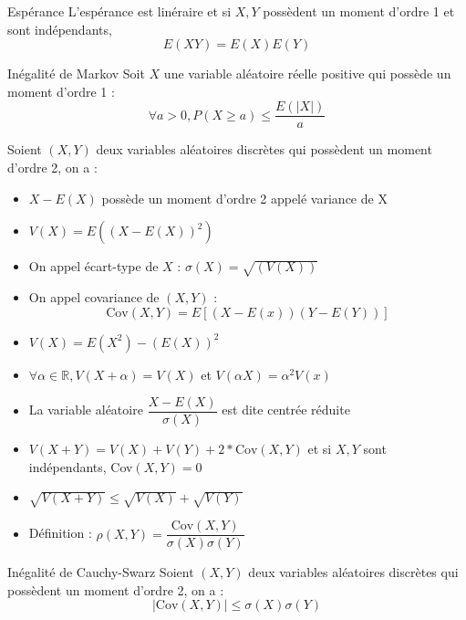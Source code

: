 \documentclass[french, a4paper, 10pt, twocolumn]{article}
\newcommand{\R}{\mathbb{R}}   %
\begin{document}
\begin{theoreme}{Espérance}
    L'espérance est linéraire et si \(X,Y\) possèdent un moment d'ordre 1 et sont indépendants,
    \[E(XY)=E(X)E(Y)\]
\end{theoreme}

\begin{theoreme}{Inégalité de Markov}
    Soit $X$ une variable aléatoire réelle positive qui possède un moment d'ordre 1 :
     \[\forall a>0, {P(X\geqslant a)\leqslant \frac{E(|X|)}{a}}\]
\end{theoreme}
 
\begin{definition}
    Soient \((X,Y)\) deux variables aléatoires discrètes qui possèdent un moment d'ordre 2, on a :
    \begin{itemize}[label=\(\bullet\)]
        \item \(X-E(X)\) possède un moment d'ordre 2 appelé variance de X
        \item \(V(X)=E((X-E(X))^2)\)
        \item On appel écart-type de \(X\) : \(\sigma(X)=\sqrt{(V(X))}\)
        \item On appel covariance de \((X,Y)\) : \[\mathrm{Cov}(X,Y)=E[(X-E(x))(Y-E(Y))]\]
    \end{itemize}

    \tcblower
    \begin{itemize}
        \item \(V(X)=E(X^2)-(E(X))^2\)
        \item \(\forall \alpha \in \R, V(X+\alpha)=V(X)\) et \(V(\alpha X)=\alpha^2V(x)\)
        \item La variable aléatoire \(\dfrac{X-E(X)}{\sigma(X)}\) est dite centrée réduite
        \item \(V(X+Y)=V(X)+V(Y)+2*\text{Cov}(X,Y)\) et si \(X,Y\) sont indépendants, Cov\((X,Y)=0\)
        \item \(\sqrt{V(X+Y)}\leq\sqrt{V(X)}+\sqrt{V(Y)}\)
        \item Définition : \(\rho(X,Y)=\dfrac{\text{Cov}(X,Y)}{\sigma(X)\sigma(Y)}\)
    \end{itemize}
\end{definition}

\begin{theoreme}{Inégalité de Cauchy-Swarz}
    Soient \((X,Y)\) deux variables aléatoires discrètes qui possèdent un moment d'ordre 2, on a :
        \[|\text{Cov}(X,Y)|\leq \sigma(X)\sigma(Y)\] 
\end{theoreme}
\end{document}
